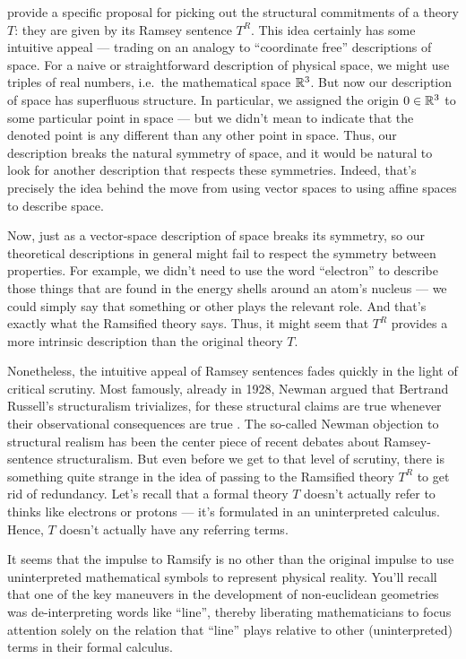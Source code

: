 \cite{zahar2001,cruse,zahar2004} provide a specific proposal for
picking out the structural commitments of a theory $T$: they are given
by its Ramsey sentence $T^R$.  This idea certainly has some intuitive
appeal --- trading on an analogy to ``coordinate free'' descriptions
of space.  For a naive or straightforward description of physical
space, we might use triples of real numbers, i.e.\ the mathematical
space $\mathbb R ^3$.  But now our description of space has superfluous
structure.  In particular, we assigned the origin $0\in\mathbb R ^3$ to some
particular point in space --- but we didn't mean to indicate that the
denoted point is any different than any other point in space.  Thus,
our description breaks the natural symmetry of space, and it would be
natural to look for another description that respects these
symmetries.  Indeed, that's precisely the idea behind the move from
using vector spaces to using affine spaces to describe space.

Now, just as a vector-space description of space breaks its symmetry,
so our theoretical descriptions in general might fail to respect the
symmetry between properties.  For example, we didn't need to use the
word ``electron'' to describe those things that are found in the
energy shells around an atom's nucleus --- we could simply say that
something or other plays the relevant role.  And that's exactly what
the Ramsified theory says.  Thus, it might seem that $T^R$ provides a
more intrinsic description than the original theory $T$.

Nonetheless, the intuitive appeal of Ramsey sentences fades quickly in
the light of critical scrutiny.  Most famously, already in 1928,
Newman argued that Bertrand Russell's structuralism trivializes, for
these structural claims are true whenever their observational
consequences are true \cite[see][]{newman1928}.  The so-called Newman
objection to structural realism has been the center piece of recent
debates about Ramsey-sentence structuralism.  But even before we get
to that level of scrutiny, there is something quite strange in the
idea of passing to the Ramsified theory $T^R$ to get rid of
redundancy.  Let's recall that a formal theory $T$ doesn't actually
refer to thinks like electrons or protons --- it's formulated in an
uninterpreted calculus.  Hence, $T$ doesn't actually have any
referring terms.

It seems that the impulse to Ramsify is no other than the original
impulse to use uninterpreted mathematical symbols to represent
physical reality.  You'll recall that one of the key maneuvers in the
development of non-euclidean geometries was de-interpreting words like
``line'', thereby liberating mathematicians to focus attention solely
on the relation that ``line'' plays relative to other (uninterpreted)
terms in their formal calculus.

